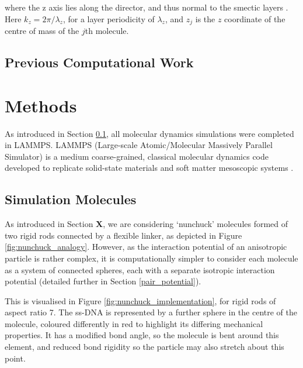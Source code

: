 \documentclass[11pt, a4paper]{article} %
\begin{document}
where the z axis lies along the director, and thus normal to the smectic layers \cite{Polson1997}. Here $k_{z} = 2\pi/\lambda_{z}$, for a layer periodicity of $\lambda_{z}$, and $z_{j}$ is the $z$ coordinate of the centre of mass of the $j$th molecule.

\subsection{Previous Computational Work} \label{sec:PrevWork}

\section{Methods}
As introduced in Section \ref{sec:PrevWork}, all molecular dynamics simulations were completed in LAMMPS. LAMMPS (Large-scale Atomic/Molecular Massively Parallel Simulator) is a medium coarse-grained, classical molecular dynamics code developed to replicate  solid-state materials and soft matter mesoscopic systems \cite{Plimpton1995, LAMMPS}.



\subsection{Simulation Molecules}
As introduced in Section \textbf{X}, we are considering `nunchuck' molecules formed of two rigid rods connected by a flexible linker, as depicted in Figure \ref{fig:nunchuck_analogy}. However, as the interaction potential of an anisotropic particle is rather complex, it is computationally simpler to consider each molecule as a system of connected spheres, each with a separate isotropic interaction potential (detailed further in Section \ref{pair_potential}).

This is visualised in Figure \ref{fig:nunchuck_implementation}, for rigid rods of aspect ratio 7. The ss-DNA is represented by a further sphere in the centre of the molecule, coloured differently in red to highlight its differing mechanical properties. It has a modified bond angle, so the molecule is bent around this element, and reduced bond rigidity so the particle may also stretch about this point. 
\end{document}
